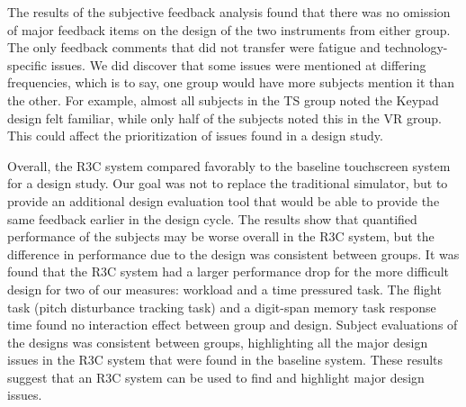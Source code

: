 The results of the subjective feedback analysis found that there was no omission of major feedback items on the design of the two instruments from either group.
The only feedback comments that did not transfer were fatigue and technology-specific issues.
We did discover that some issues were mentioned at differing frequencies, which is to say, one group would have more subjects mention it than the other.
For example, almost all subjects in the TS group noted the Keypad design felt familiar, while only half of the subjects noted this in the VR group.
This could affect the prioritization of issues found in a design study.

Overall, the R3C system compared favorably to the baseline touchscreen system for a design study.
Our goal was not to replace the traditional simulator, but to provide an additional design evaluation tool that would be able to provide the same feedback earlier in the design cycle.
The results show that quantified performance of the subjects may be worse overall in the R3C system, but the difference in performance due to the design was consistent between groups.
It was found that the R3C system had a larger performance drop for the more difficult design for two of our measures: workload and a time pressured task.
The flight task (pitch disturbance tracking task) and a digit-span memory task response time found no interaction effect between group and design.
Subject evaluations of the designs was consistent between groups, highlighting all the major design issues in the R3C system that were found in the baseline system.
These results suggest that an R3C system can be used to find and highlight major design issues.

